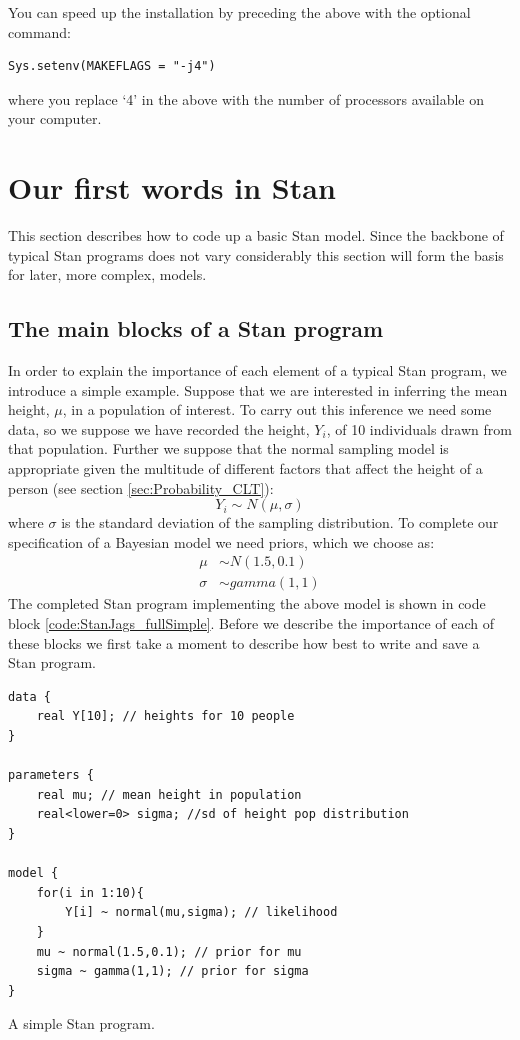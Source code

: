 \documentclass[11pt,fullpage]{book}
\begin{document}
You can speed up the installation by preceding the above with the optional command:
\begin{verbatim}
Sys.setenv(MAKEFLAGS = "-j4") 
\end{verbatim}

where you replace `4' in the above with the number of processors available on your computer.

\section{Our first words in Stan}
This section describes how to code up a basic Stan model. Since the backbone of typical Stan programs does not vary considerably this section will form the basis for later, more complex, models.

\subsection{The main blocks of a Stan program}
In order to explain the importance of each element of a typical Stan program, we introduce a simple example. Suppose that we are interested in inferring the mean height, $\mu$, in a population of interest. To carry out this inference we need some data, so we suppose we have recorded the height, $Y_i$, of 10 individuals drawn from that population. Further we suppose that the normal sampling model is appropriate given the multitude of different factors that affect the height of a person (see section \ref{sec:Probability_CLT}):
%
\begin{equation}
Y_i \sim N(\mu,\sigma)
\end{equation} 
%
where $\sigma$ is the standard deviation of the sampling distribution. To complete our specification of a Bayesian model we need priors, which we choose as:
\begin{align}
\mu &\sim N(1.5,0.1)\\
\sigma &\sim gamma(1,1)
\end{align}
The completed Stan program implementing the above model is shown in code block \ref{code:StanJags_fullSimple}. Before we describe the importance of each of these blocks we first take a moment to describe how best to write and save a Stan program.

\begin{listing}[H]
	\begin{verbatim}
data {
    real Y[10]; // heights for 10 people
}

parameters {
    real mu; // mean height in population
    real<lower=0> sigma; //sd of height pop distribution
}

model {
    for(i in 1:10){
        Y[i] ~ normal(mu,sigma); // likelihood
    }
    mu ~ normal(1.5,0.1); // prior for mu
    sigma ~ gamma(1,1); // prior for sigma
}
	\end{verbatim}
	\caption{A simple Stan program.}
	\label{code:StanJags_fullSimple}
	\end{listing}
\end{document}
